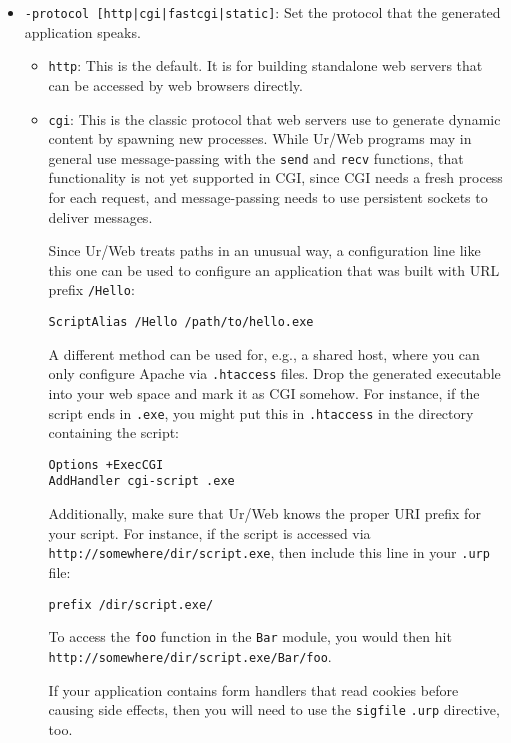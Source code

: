 \documentclass{article}
\begin{document}
\begin{itemize}
\item \texttt{-protocol [http|cgi|fastcgi|static]}: Set the protocol that the generated application speaks.
  \begin{itemize}
  \item \texttt{http}: This is the default.  It is for building standalone web servers that can be accessed by web browsers directly.

  \item \texttt{cgi}: This is the classic protocol that web servers use to generate dynamic content by spawning new processes.  While Ur/Web programs may in general use message-passing with the \texttt{send} and \texttt{recv} functions, that functionality is not yet supported in CGI, since CGI needs a fresh process for each request, and message-passing needs to use persistent sockets to deliver messages.

    Since Ur/Web treats paths in an unusual way, a configuration line like this one can be used to configure an application that was built with URL prefix \texttt{/Hello}:
    \begin{verbatim}
ScriptAlias /Hello /path/to/hello.exe
    \end{verbatim}

    A different method can be used for, e.g., a shared host, where you can only configure Apache via \texttt{.htaccess} files.  Drop the generated executable into your web space and mark it as CGI somehow.  For instance, if the script ends in \texttt{.exe}, you might put this in \texttt{.htaccess} in the directory containing the script:
    \begin{verbatim}
Options +ExecCGI
AddHandler cgi-script .exe
    \end{verbatim}

    Additionally, make sure that Ur/Web knows the proper URI prefix for your script.  For instance, if the script is accessed via \texttt{http://somewhere/dir/script.exe}, then include this line in your \texttt{.urp} file:
    \begin{verbatim}
prefix /dir/script.exe/
    \end{verbatim}

    To access the \texttt{foo} function in the \texttt{Bar} module, you would then hit \texttt{http://somewhere/dir/script.exe/Bar/foo}.

    If your application contains form handlers that read cookies before causing side effects, then you will need to use the \texttt{sigfile} \texttt{.urp} directive, too.


\end{itemize}
\end{itemize}
\end{document}
